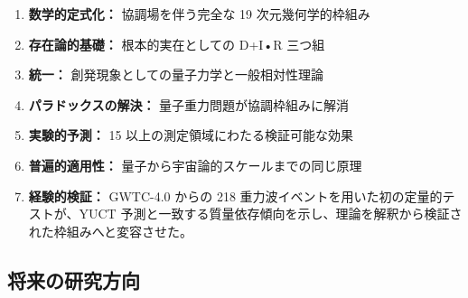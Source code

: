 \documentclass[11pt,a4paper]{article}
\theoremstyle{remark}
\begin{document}
	\begin{enumerate}
		\item \textbf{数学的定式化：} 協調場を伴う完全な 19 次元幾何学的枠組み
		
		\item \textbf{存在論的基礎：} 根本的実在としての D+I•R 三つ組
		
		\item \textbf{統一：} 創発現象としての量子力学と一般相対性理論
		
		\item \textbf{パラドックスの解決：} 量子重力問題が協調枠組みに解消
		
		\item \textbf{実験的予測：} 15 以上の測定領域にわたる検証可能な効果
		
		\item \textbf{普遍的適用性：} 量子から宇宙論的スケールまでの同じ原理
		
		\item \textbf{経験的検証：} GWTC-4.0 からの 218 重力波イベントを用いた初の定量的テストが、YUCT 予測と一致する質量依存傾向を示し、理論を解釈から検証された枠組みへと変容させた。
	\end{enumerate}
	
	\subsection{将来の研究方向}
	
\end{document}

